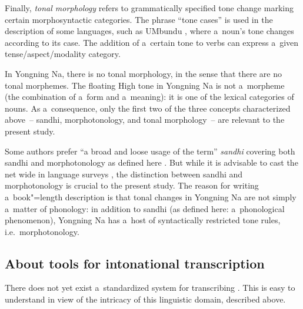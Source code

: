 Finally, \textit{tonal morphology} refers to grammatically specified tone change marking certain morphosyntactic categories. The phrase “tone cases” is used in the description of some  languages, such as UMbundu \citep{schadeberg1986tone}, where a~noun's tone changes according to its case. 
The addition of a~certain tone to verbs can express a~given tense/aspect/modality category. 

In Yongning Na, there is no tonal morphology, in the sense that there are no tonal morphemes. The floating High tone in Yongning Na is not a~morpheme (the combination of a~form and a~meaning): it is one of the lexical categories of nouns. As a~consequence, only the first two of the three concepts characterized above~-- sandhi, morphotonology, and tonal morphology~-- are relevant to the present study. 

Some authors prefer “a broad and loose usage of the term” \textit{sandhi} covering both sandhi and morphotonology as defined here \citep[x]{chen2000}. But while it is advisable to cast the net wide in language surveys \citep[such as the survey of Chinese dialects by][]{chen2000}, the distinction between sandhi and morphotonology is crucial to the present study. The reason for writing a~book"=length description is that tonal changes in Yongning Na are not simply a~matter of phonology: in addition to sandhi (as defined here: a~phonological phenomenon), Yongning Na has a~host of syntactically restricted tone rules, i.e.\ morphotonology. 


\subsection[About tools for intonational transcription]{About tools for intonational transcription}
\label{sec:theabsenceoffullysatisfactorytoolsforintonationaltranscription}

There does not yet exist a~standardized system for transcribing . This is easy to
understand in view of the intricacy of this linguistic domain, described above. 

